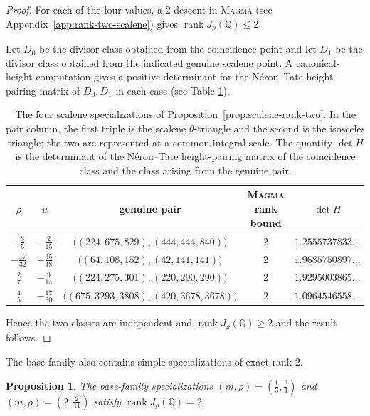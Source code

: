 \documentclass[11pt]{amsart}
\theoremstyle{plain}
\newtheorem{prop}[thm]{Proposition}
\theoremstyle{remark}
\theoremstyle{plain}
\newcommand{\Q}{\mathbb{Q}}
\begin{document}
\begin{proof}
For each of the four values, a $2$-descent in \textsc{Magma}
(see Appendix~\ref{app:rank-two-scalene}) gives
$\operatorname{rank}J_\rho(\Q)\leq2$.

Let $D_0$ be the divisor class obtained from the coincidence point and
let $D_1$ be the divisor class obtained from the indicated genuine
scalene point. A canonical-height computation gives a positive
determinant for the N\'eron--Tate height-pairing matrix of
$D_0,D_1$ in each case (see Table \ref{tab:scalene-rank-two}).


\begin{table}[H]
\centering
\small
\begin{tabular}{ccccc}
\toprule
$\rho$ & $u$ & genuine pair & \textsc{Magma} rank bound & $\det H$ \\
\midrule
$-\frac35$
& $-\frac2{15}$
& $\bigl((224,675,829),(444,444,840)\bigr)$
& $2$ & $1.2555737833\ldots$ \\

$-\frac{17}{32}$
& $-\frac{35}{48}$
& $\bigl((64,108,152),(42,141,141)\bigr)$
& $2$ & $1.9685750897\ldots$ \\

$\frac27$
& $-\frac9{14}$
& $\bigl((224,275,301),(220,290,290)\bigr)$
& $2$ & $1.9295003865\ldots$ \\

$\frac45$
& $-\frac{17}{30}$
& $\bigl((675,3293,3808),(420,3678,3678)\bigr)$
& $2$ & $1.0964546558\ldots$ \\
\bottomrule
\end{tabular}
\caption{The four scalene specializations of
Proposition~\ref{prop:scalene-rank-two}. In the pair column, the first
triple is the scalene $\theta$-triangle and the second is the
isosceles triangle; the two are represented at a common integral
scale. The quantity $\det H$ is the determinant of the
N\'eron--Tate height-pairing matrix of the coincidence class and the
class arising from the genuine pair.}
\label{tab:scalene-rank-two}
\end{table}
Hence the two classes are independent and
$\operatorname{rank}J_\rho(\Q)\geq2$ and the result follows.
\end{proof}

The base family also contains simple specializations of exact rank $2$.

\begin{prop}\label{prop:base-rank-two-examples}
The base-family specializations
$
(m,\rho)=\left(\frac13,\frac34\right)$ and
$(m,\rho)=\left(2,\frac2{11}\right)$
satisfy
$\operatorname{rank}J_\rho(\Q)=2.$
\end{prop}
\end{document}
